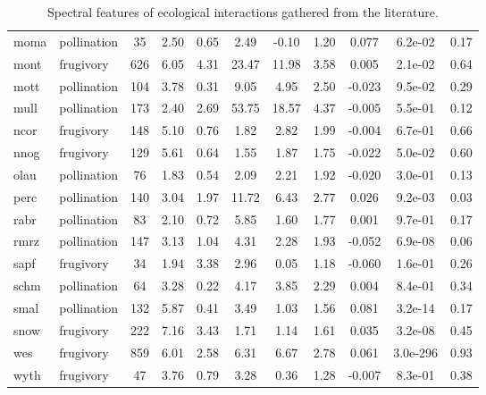 \begin{table}[]
{\begin{tabular}{@{}llccccccccc@{}}
moma \cite{moma} & pollination & 35 & 2.50 & 0.65 & 2.49 & -0.10 & 1.20 & 0.077 & 6.2e-02 & 0.17 \\
mont \cite{mont} & frugivory & 626 & 6.05 & 4.31 & 23.47 & 11.98 & 3.58 & 0.005 & 2.1e-02 & 0.64 \\
mott \cite{mott} & pollination & 104 & 3.78 & 0.31 & 9.05 & 4.95 & 2.50 & -0.023 & 9.5e-02 & 0.29 \\
mull \cite{mull} & pollination & 173 & 2.40 & 2.69 & 53.75 & 18.57 & 4.37 & -0.005 & 5.5e-01 & 0.12 \\
ncor \cite{ncor} & frugivory & 148 & 5.10 & 0.76 & 1.82 & 2.82 & 1.99 & -0.004 & 6.7e-01 & 0.66 \\
nnog \cite{nnog} & frugivory & 129 & 5.61 & 0.64 & 1.55 & 1.87 & 1.75 & -0.022 & 5.0e-02 & 0.60 \\
olau \cite{olau} & pollination & 76 & 1.83 & 0.54 & 2.09 & 2.21 & 1.92 & -0.020 & 3.0e-01 & 0.13 \\
perc \cite{perc} & pollination & 140 & 3.04 & 1.97 & 11.72 & 6.43 & 2.77 & 0.026 & 9.2e-03 & 0.03 \\
rabr \cite{rabr} & pollination & 83 & 2.10 & 0.72 & 5.85 & 1.60 & 1.77 & 0.001 & 9.7e-01 & 0.17 \\
rmrz \cite{rmrz} & pollination & 147 & 3.13 & 1.04 & 4.31 & 2.28 & 1.93 & -0.052 & 6.9e-08 & 0.06 \\
sapf \cite{sapf} & frugivory & 34 & 1.94 & 3.38 & 2.96 & 0.05 & 1.18 & -0.060 & 1.6e-01 & 0.26 \\
schm \cite{schm} & pollination & 64 & 3.28 & 0.22 & 4.17 & 3.85 & 2.29 & 0.004 & 8.4e-01 & 0.34 \\
smal \cite{smal} & pollination & 132 & 5.87 & 0.41 & 3.49 & 1.03 & 1.56 & 0.081 & 3.2e-14 & 0.17 \\
snow \cite{snow} & frugivory & 222 & 7.16 & 3.43 & 1.71 & 1.14 & 1.61 & 0.035 & 3.2e-08 & 0.45 \\
wes  \cite{wes}  & frugivory & 859 & 6.01 & 2.58 & 6.31 & 6.67 & 2.78 & 0.061 & 3.0e-296 & 0.93 \\
wyth \cite{wyth} & frugivory & 47 & 3.76 & 0.79 & 3.28 & 0.36 & 1.28 & -0.007 & 8.3e-01 & 0.38 \\ \bottomrule
\end{tabular}%
}
\caption{Spectral features of ecological interactions gathered from the literature.}
\label{FP_studies_table}
\end{table}
